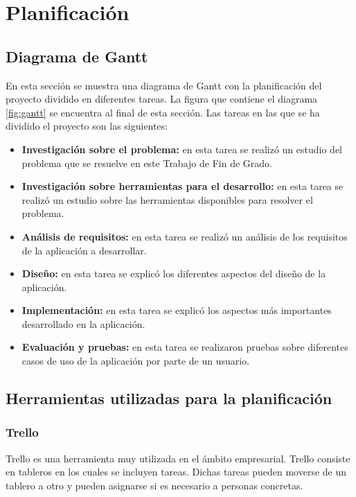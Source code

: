 \section{Planificación}
\subsection[Diagrama de Gantt]{Diagrama de Gantt}
En esta sección se muestra una diagrama de Gantt con la planificación del proyecto dividido en diferentes tareas. La figura que contiene el diagrama \ref{fig:gantt} se encuentra al final de esta sección. Las tareas en las que se ha dividido el proyecto son las siguientes:
\begin{itemize}
	\item \textbf{Investigación sobre el problema:} en esta tarea se realizó un estudio del problema que se resuelve en este Trabajo de Fin de Grado.
	\item \textbf{Investigación sobre herramientas para el desarrollo:} en esta tarea se realizó un estudio sobre las herramientas disponibles para resolver el problema.
	\item \textbf{Análisis de requisitos:} en esta tarea se realizó un análisis de los requisitos de la aplicación a desarrollar.
	\item \textbf{Diseño:} en esta tarea se explicó los diferentes aspectos del diseño de la aplicación.
	\item \textbf{Implementación:} en esta tarea se explicó los aspectos más importantes desarrollado en la aplicación.
	\item \textbf{Evaluación y pruebas:} en esta tarea se realizaron pruebas sobre diferentes casos de uso de la aplicación por parte de un usuario.
\end{itemize}

\subsection[Herramientas utilizadas para la planificación]{Herramientas utilizadas para la planificación}
\subsubsection{Trello}
Trello \cite{trello} es una herramienta muy utilizada en el ámbito empresarial. Trello consiste en tableros en los cuales se incluyen tareas. Dichas tareas pueden moverse de un tablero a otro y pueden asignarse si es necesario a personas concretas.\newline

